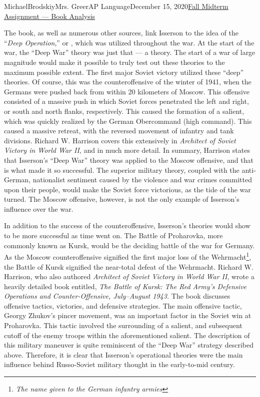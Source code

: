\documentclass[12pt,letterpaper]{article}
\begin{document}
\begin{mla}{Michael}{Brodskiy}{Mrs. Greer}{AP Language}{December 15, 2020}{\underline{Fall Midterm Assignment — Book Analysis}}
  \begin{justify}
    \vspace{-12pt}\quad The book, as well as numerous other sources, link Isserson to the idea of the “\textit{Deep Operation},” or \textit{}, which was utilized throughout the war. At the start of the war, the “Deep War” theory was just that — a theory. The start of a war of large magnitude would make it possible to truly test out these theories to the maximum possible extent. The first major Soviet victory utilized these “deep” theories. Of course, this was the counteroffensive of the winter of 1941, when the Germans were pushed back from within 20 kilometers of Moscow. This offensive consisted of a massive push in which Soviet forces penetrated the left and right, or south and north flanks, respectively. This caused the formation of a salient, which was quickly realized by the German Obercommand (high command). This caused a massive retreat, with the reversed movement of infantry and tank divisions. Richard W. Harrison covers this extensively in \textit{Architect of Soviet Victory in World War II}, and in much more detail. In summary, Harrison states that Isserson's “Deep War” theory was applied to the Moscow offensive, and that is what made it so successful. The superior military theory, coupled with the anti-German, nationalist sentiment caused by the violence and war crimes committed upon their people, would make the Soviet force victorious, as the tide of the war turned. The Moscow offensive, however, is not the only example of Isserson's influence over the war.
  \end{justify}

  \begin{justify}
    \vspace{-12pt}\quad In addition to the success of the counteroffensive, Isserson's theories would show to be more successful as time went on. The Battle of Proharovka, more commonly known as Kursk, would be the deciding battle of the war for Germany. As the Moscow counteroffensive signified the first major loss of the Wehrmacht\footnote{\textit{The name given to the German infantry armies}}, the Battle of Kursk signified the near-total defeat of the Wehrmacht. Richard W. Harrison, who also authored \textit{Architect of Soviet Victory in World War II}, wrote a heavily detailed book entitled, \textit{The Battle of Kursk: The Red Army's Defensive Operations and Counter-Offensive, July–August 1943.} The book discusses offensive tactics, victories, and defensive strategies. The main offensive tactic, Georgy Zhukov's pincer movement, was an important factor in the Soviet win at Proharovka. This tactic involved the surrounding of a salient, and subsequent cutoff of the enemy troops within the aforementioned salient. The description of this military maneuver is quite reminiscent of the “Deep War” strategy described above. Therefore, it is clear that Isserson's operational theories were the main influence behind Russo-Soviet military thought in the early-to-mid  century.
  \end{justify}


\end{mla}
\end{document}
